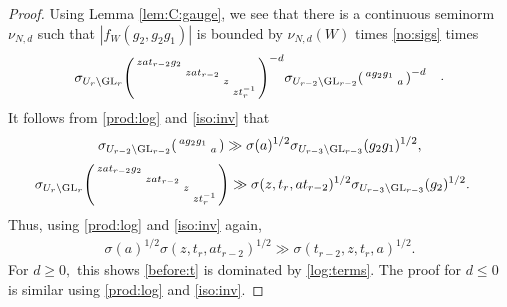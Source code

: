 \documentclass[12pt]{amsart}
\theoremstyle{remark}
\numberwithin{equation}{section}
\newcommand{\GL}{\mathrm{GL}}
\theoremstyle{definition}
\newenvironment{psmatrix}
  {\left(\begin{smallmatrix}}
  {\end{smallmatrix}\right)}
\numberwithin{equation}{subsection}
\begin{document}
\begin{proof}
Using Lemma \ref{lem:C:gauge}, we see that there is a continuous seminorm $\nu_{N,d}$ such that $
|f_{W}(g_2,g_2g_1)|$ is bounded by
$\nu_{N,d}\left(W \right)$ times \eqref{no:sigs}
times
\begin{align} \label{before:t}  \begin{split}
    &\sigma_{U_{r} \backslash \GL_r}\begin{psmatrix}zat_{r-2} g_2 & & &\\ & zat_{r-2}  & \\ & & z & \\ & & &zt_r^{-1}  \end{psmatrix}^{-d}\sigma_{U_{r-2} \backslash \GL_{r-2}}\begin{psmatrix} ag_2g_1 & \\ & a\end{psmatrix}^{-d}\end{split}.
\end{align}
It follows from \eqref{prod:log} and \eqref{iso:inv} that 
\begin{align*}
 \sigma_{U_{r-2} \backslash \GL_{r-2}}\begin{psmatrix} ag_2g_1& \\ & a\end{psmatrix}\gg \sigma(a)^{1/2}\sigma_{U_{r-3} \backslash \GL_{r-3}}(g_2g_1)^{1/2},
\end{align*}
\begin{align*}
    &\sigma_{U_{r} \backslash \GL_r}\begin{psmatrix}zat_{r-2} g_2 & & &\\ & zat_{r-2}  & \\ & & z & \\ & & &zt_r^{-1}  \end{psmatrix}\gg 
    \sigma(z,t_r,at_{r-2})^{1/2}\sigma_{U_{r-3} \backslash \GL_{r-3}}(g_2)^{1/2}.
\end{align*}
Thus, using \eqref{prod:log} and \eqref{iso:inv} again, 
\begin{align*}
    \sigma(a)^{1/2}\sigma(z,t_r,at_{r-2})^{1/2}\gg \sigma(t_{r-2},z,t_r,a)^{1/2}.
\end{align*}
For $d\ge 0,$ this shows \eqref{before:t} is dominated by \eqref{log:terms}. The proof for $d\le 0$ is similar using \eqref{prod:log} and \eqref{iso:inv}. 
\end{proof}
\end{document}
